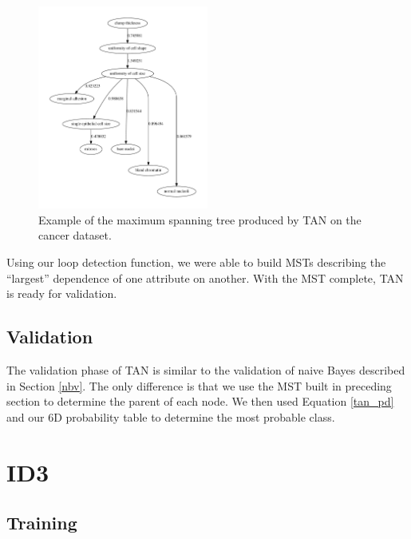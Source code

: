\documentclass{article}
\begin{document}
		\begin{figure}
			\centering
			\includegraphics[width=0.5\textwidth]{figs/TAN/cancer}
			\caption{Example of the maximum spanning tree produced by TAN on the cancer dataset.}
		\end{figure}
		
		Using our loop detection function, we were able to build MSTs describing the ``largest'' dependence of one attribute on another. With the MST complete, TAN is ready for validation.
		
	\subsection{Validation}
		
		The validation phase of TAN is similar to the validation of naive Bayes described in Section \ref{nbv}. The only difference is that we use the MST built in preceding section to determine the parent of each node. We then used Equation \ref{tan_pd} and our 6D probability table to determine the most probable class.
		
\section{ID3}
	\subsection{Training}
\end{document}
